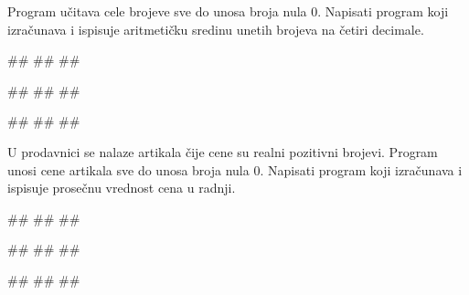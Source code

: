 \begin{Exercise}[label=1.3_18] 
Program učitava cele brojeve sve do unosa broja nula $0$. Napisati
program koji izračunava i ispisuje aritmetičku sredinu unetih brojeva
na četiri decimale.

\begin{miditest}
\begin{upotreba}{1}
#\naslovInt#
##
##
\end{upotreba}
\end{miditest}
\begin{miditest}
\begin{upotreba}{2}
#\naslovInt#
##
##
\end{upotreba}
\end{miditest}

\begin{miditest}
\begin{upotreba}{3}
#\naslovInt#
##
##
\end{upotreba}
\end{miditest}
\end{Exercise}
\begin{Answer}[ref=1.3_18]
\end{Answer}


\begin{Exercise}[label=1.3_19] 
U prodavnici se nalaze artikala čije cene su realni pozitivni
brojevi. Program unosi cene artikala sve do unosa broja nula
$0$. Napisati program koji izračunava i ispisuje prose\v cnu vrednost
cena u radnji.

\begin{miditest}
\begin{upotreba}{1}
#\naslovInt#
##
##
\end{upotreba}
\end{miditest}
\begin{miditest}
\begin{upotreba}{2}
#\naslovInt#
##
##
\end{upotreba}
\end{miditest}

\begin{miditest}
\begin{upotreba}{3}
#\naslovInt#
##
##
\end{upotreba}
\end{miditest}
\end{Exercise}
\begin{Answer}[ref=1.3_19]
\end{Answer}









